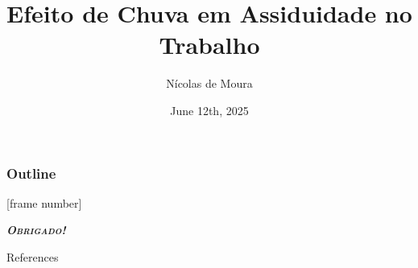 \documentclass[compress,sans,12pt,aspectratio=169]{beamer}
\title{\textbf{Efeito de Chuva em Assiduidade no Trabalho}}
\date{June 12th, 2025}
\author{Nícolas de Moura \inst{\textdagger}}
\institute{\inst{\textdagger} Escola de Economia de São Paulo - FGV/EESP}
\newcommand{\textdest}[1]{\textbf{\textit{\textsc{#1}}}}
\begin{document}
\frame[plain]{\titlepage}

    \begin{frame}[plain]
        \frametitle{Outline}
        \tableofcontents
    \end{frame}

    


\End

[frame number]


\begin{frame}
      \centering\LARGE{\textdest{Obrigado!}}
\end{frame}


\begin{frame}[allowframebreaks]{References}
    
\end{frame}
\end{document}
